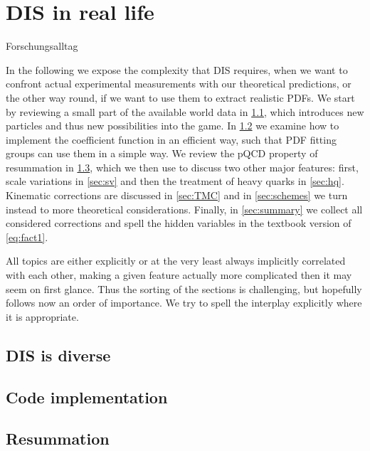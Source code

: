 \chapter{DIS in real life}
\label{chap:rl}

%
{Forschungsalltag}

In the following we expose the complexity that DIS requires, when we want to confront actual experimental measurements with our theoretical predictions, or the other way round, if we want to use them to extract realistic PDFs.
We start by reviewing a small part of the available world data in \cref{sec:diverse}, which introduces new particles and thus new possibilities into the game.
In \cref{sec:interpolation} we examine how to implement the coefficient function in an efficient way, such that PDF fitting groups can use them in a simple way.
We review the pQCD property of resummation in \cref{sec:resum}, which we then use to discuss two other major features: first, scale variations in \cref{sec:sv} and then the treatment of heavy quarks in \cref{sec:hq}.
Kinematic corrections are discussed in \cref{sec:TMC} and in \cref{sec:schemes} we turn instead to more theoretical considerations.
Finally, in \cref{sec:summary} we collect all considered corrections and spell the hidden variables in the textbook version of \cref{eq:fact1}.

All topics are either explicitly or at the very least always implicitly correlated with each other, making a given feature actually more complicated then it may seem on first glance.
Thus the sorting of the sections is challenging, but hopefully follows now an order of importance.
We try to spell the interplay explicitly where it is appropriate.

\section{DIS is diverse}
\label{sec:diverse}


\section{Code implementation}
\label{sec:interpolation}


\section{Resummation}
\label{sec:resum}


